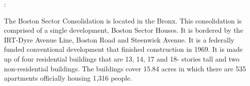 :     

   

The Boston Sector Consolidation is located in the Bronx. This consolidation is comprised of a single development, Boston Sector Houses. It is bordered by the IRT-Dyre Avenue Line, Boston Road and Steenwick Avenue. It is a federally funded conventional development that finished construction in 1969. It is made up of four residential buildings that are 13, 14, 17 and 18- stories tall and two non-residential buildings. The buildings cover 15.84 acres in which there are 535 apartments officially housing 1,316 people. 